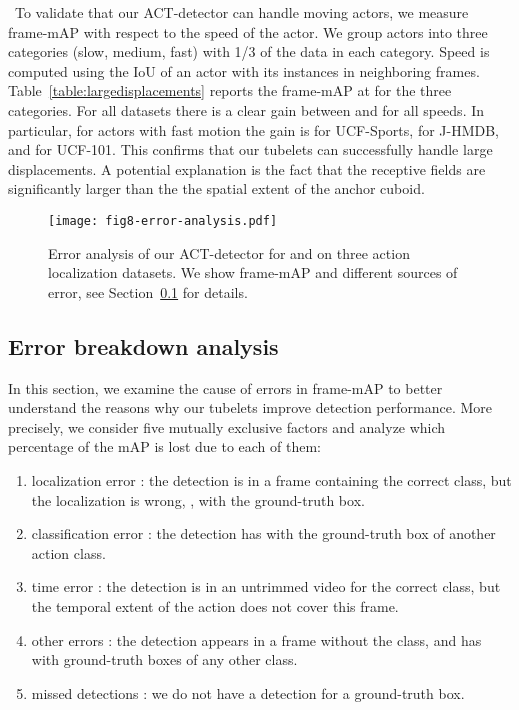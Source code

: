\documentclass[10pt,twocolumn,letterpaper]{article}
\begin{document}
~To validate that our ACT-detector can handle moving actors, we measure frame-mAP with respect to the speed of the actor. 
We group actors into three categories (slow, medium, fast) with 1/3 of the data in each category. 
Speed is computed using the IoU of an actor with its instances in  neighboring frames. 
Table~\ref{table:largedisplacements} reports the frame-mAP at  for the three categories. 
For all datasets there is a clear gain between  and  for all speeds. 
In particular, for actors with fast motion the gain is  for UCF-Sports,  for J-HMDB, and  for UCF-101. 
This confirms that our tubelets can successfully handle large displacements. 
A potential explanation is the fact that the receptive fields are significantly larger than the the spatial extent of the anchor cuboid.

\begin{figure}[t]
\centering
\texttt{[image: fig8-error-analysis.pdf]} 
\vspace{-3.5mm}
\caption{Error analysis of our ACT-detector for  and  on three action localization datasets. We show frame-mAP and different sources of error, see Section~\ref{sub:error} for details.}
\vspace{-4.5mm}
\label{fig:error}
\end{figure}

\subsection{Error breakdown analysis} 
\label{sub:error}


In this section, we examine the cause of errors in frame-mAP to better understand the reasons why our tubelets improve detection performance. More precisely, we consider five mutually exclusive factors and analyze which percentage of the mAP is lost due to each of them:
\begin{enumerate}
\item localization error : the detection is in a frame containing the correct class, but the localization is wrong, \ie,  with the ground-truth box.
\item classification error : the detection has  with the ground-truth box of another action class. 
\item time error : the detection is in an untrimmed video for the correct class, but the temporal extent of the action does not cover this frame. 
\item other errors : the detection appears in a frame without the class, and has  with ground-truth boxes of any other class.
\item missed detections : we do not have a detection for a ground-truth box.  
\end{enumerate}
\end{document}
